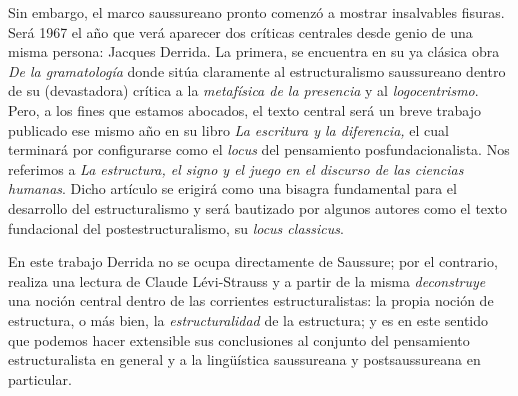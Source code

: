 Sin embargo, el marco saussureano pronto comenzó a mostrar insalvables fisuras. Será 1967 el año que verá aparecer dos críticas centrales desde genio de una misma persona: Jacques Derrida. La primera, se encuentra en su ya clásica obra \emph{De la gramatología} donde sitúa claramente al estructuralismo saussureano dentro de su (devastadora) crítica a la \emph{metafísica de la presencia} y al \emph{logocentrismo}. Pero, a los fines que estamos abocados, el texto central será un breve trabajo publicado ese mismo año en su libro \emph{La escritura y la diferencia,} el cual terminará por configurarse como el \emph{locus} del pensamiento posfundacionalista. Nos referimos a \emph{La estructura, el signo y el juego en el discurso de las ciencias humanas}. Dicho artículo se erigirá como una bisagra fundamental para el desarrollo del estructuralismo y será bautizado por algunos autores como el texto fundacional del postestructuralismo, su \emph{locus classicus}.

En este trabajo Derrida no se ocupa directamente de Saussure; por el contrario, realiza una lectura de Claude Lévi-Strauss y a partir de la misma \emph{deconstruye} una noción central dentro de las corrientes estructuralistas: la propia noción de estructura, o más bien, la \emph{estructuralidad} de la estructura; y es en este sentido que podemos hacer extensible sus conclusiones al conjunto del pensamiento estructuralista en general y a la lingüística saussureana y postsaussureana en particular.

